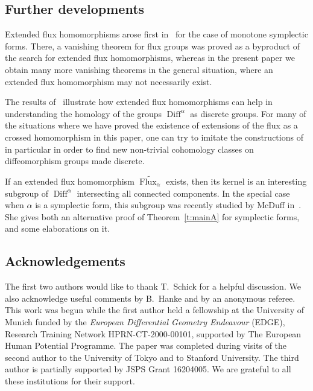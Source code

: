\documentclass[12pt]{amsart}
\theoremstyle{definition}
\theoremstyle{remark}
\newcommand\Flux{\operatorname{Flux}}
\newcommand\Symp{\operatorname{Symp}}
\newcommand\Diff{\operatorname{Diff}}
\begin{document}
\subsection{Further developments}
Extended flux homomorphisms arose first in~\cite{KM} for the case of monotone symplectic
forms. There, a vanishing theorem for flux groups was proved as a byproduct of 
the search for extended flux homomorphisms, whereas in the present paper we obtain
many more vanishing theorems in the general situation, where an extended flux 
homomorphism may not necessarily exist. 

The results of~\cite{KM,KM2} illustrate how extended flux homomorphisms can help in understanding 
the homology of the groups $\Diff^{\alpha}$ as discrete groups. For many of the situations 
where we have proved the existence of extensions of the flux as a crossed homomorphism 
in this paper, one can try to imitate the constructions of~\cite{KM2} in particular in order to 
find new non-trivial cohomology classes on diffeomorphism groups made discrete. 

If an extended flux homomorphism $\widetilde{\Flux_{\alpha}}$ exists, then its kernel is an 
interesting subgroup of $\Diff^{\alpha}$ intersecting all connected components. In the special case when 
$\alpha$ is a symplectic form, this subgroup was recently studied by McDuff in~\cite{McDuffPrep}. She 
gives both an alternative proof of Theorem~\ref{t:mainA} for symplectic forms, and some elaborations on it.


    
\subsection*{Acknowledgements}
The first two authors would like to thank T.~Schick for a helpful discussion. We also acknowledge 
useful comments by B.~Hanke and by an anonymous referee.
This work was begun while the first author held a fellowship at the University of Munich funded by the 
{\sl European Differential Geometry Endeavour} (EDGE), Research Training Network HPRN-CT-2000-00101,
supported by The European Human Potential Programme. The paper was completed during visits of the second 
author to the University of Tokyo and to Stanford University. The third author is partially supported by JSPS Grant 
16204005. We are grateful to all these institutions for their support. 
\end{document}
